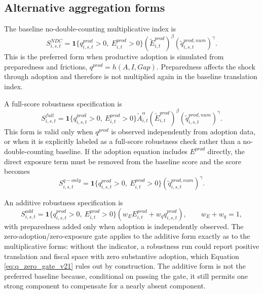 \documentclass[11pt,a4paper]{article}
\begin{document}
\subsection{Alternative aggregation forms}

The baseline no-double-counting multiplicative index is
\begin{equation}
    S^{NDC}_{i,s,t}=\mathbf{1}\{q^{prod}_{i,s,t}>0,\ E^{prod}_{i,t}>0\}(\tilde E^{prod}_{i,t})^{\beta}(\tilde q^{prod,num}_{i,s,t})^{\gamma}.
\end{equation}
This is the preferred form when productive adoption is simulated from preparedness and frictions, $q^{prod}=h(A,I,Gap)$. Preparedness affects the shock through adoption and therefore is not multiplied again in the baseline translation index.

A full-score robustness specification is
\begin{equation}
    S^{full}_{i,s,t}=\mathbf{1}\{q^{prod}_{i,s,t}>0,\ E^{prod}_{i,t}>0\}\tilde A_{i,t}^{\alpha}(\tilde E^{prod}_{i,t})^{\beta}(\tilde q^{prod,num}_{i,s,t})^{\gamma}.
\end{equation}
This form is valid only when $q^{prod}$ is observed independently from adoption data, or when it is explicitly labeled as a full-score robustness check rather than a no-double-counting baseline. If the adoption equation includes $E^{prod}$ directly, the direct exposure term must be removed from the baseline score and the score becomes
\begin{equation}
    S^{q-only}_{i,s,t}=\mathbf{1}\{q^{prod}_{i,s,t}>0,\ E^{prod}_{i,t}>0\}(\tilde q^{prod,num}_{i,s,t})^{\gamma}.
\end{equation}

An additive robustness specification is
\begin{equation}
    S^{add}_{i,s,t}=\mathbf{1}\{q^{prod}_{i,s,t}>0,\ E^{prod}_{i,t}>0\}\left(w_E E^{prod}_{i,t}+w_q q^{prod}_{i,s,t}\right),
    \qquad w_E+w_q=1,
\end{equation}
with preparedness added only when adoption is independently observed. The zero-adoption/zero-exposure gate applies to the additive form exactly as to the multiplicative forms: without the indicator, a robustness run could report positive translation and fiscal space with zero substantive adoption, which Equation \eqref{eq:q_zero_gate_v21} rules out by construction. The additive form is not the preferred baseline because, conditional on passing the gate, it still permits one strong component to compensate for a nearly absent component.
\end{document}
